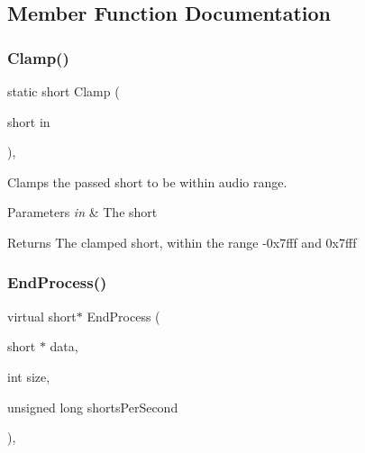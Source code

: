 \subsection{Member Function Documentation}
\mbox{\label{struct_audio_effect_a5d36494f57fe50ba0ec4f49f3d1eeac4}} 
\subsubsection{\texorpdfstring{Clamp()}{Clamp()}}
{\footnotesize\ttfamily static short Clamp (\begin{DoxyParamCaption}\item[{short}]{in }\end{DoxyParamCaption})\hspace{0.3cm}{\ttfamily [inline]}, {\ttfamily [static]}}



Clamps the passed short to be within audio range. 


\begin{DoxyParams}{Parameters}
{\em in} & The short \\
\hline
\end{DoxyParams}
\begin{DoxyReturn}{Returns}
The clamped short, within the range -\/0x7fff and 0x7fff 
\end{DoxyReturn}
\mbox{\label{struct_audio_effect_a94cbc22a743bebbae125a60dda7a8b6d}} 
\subsubsection{\texorpdfstring{End\+Process()}{EndProcess()}}
{\footnotesize\ttfamily virtual short$\ast$ End\+Process (\begin{DoxyParamCaption}\item[{short $\ast$}]{data,  }\item[{int}]{size,  }\item[{unsigned long}]{shorts\+Per\+Second }\end{DoxyParamCaption})\hspace{0.3cm}{\ttfamily [inline]}, {\ttfamily [virtual]}}



